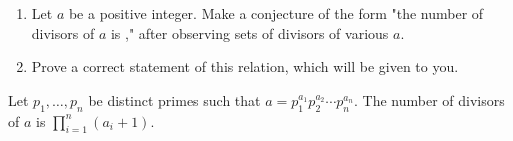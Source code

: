 \documentclass[letterpaper,12pt]{article}
\begin{document}
\begin{enumerate}
\item
Let $a$ be a positive integer. Make a conjecture of the form "the number of divisors of $a$ is \underline{\hspace{3cm}}," after observing sets of divisors of various $a$.

\item
Prove a correct statement of this relation, which will be given to you.

\end{enumerate}
 Let $p_1,\dots,p_n$ be distinct primes such that $a=p_1^{a_1}p_2^{a_2}\cdots p_n^{a_n}$. The number of divisors of $a$ is $\prod_{i=1}^n(a_i+1)$.
\end{document}
